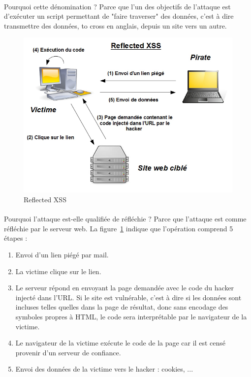 \paragraph{} Pourquoi cette dénomination ? Parce que l'un des objectifs de l'attaque est d’exécuter un script permettant de "faire traverser" des données, c'est à dire transmettre des données, to cross en anglais, depuis un site vers un autre. 

\begin{figure}[!h]
	\begin{center} 
		\includegraphics[scale=\scalekad]{images/xss/reflected_xss}
		\caption{Reflected XSS}
		\label{reflected_xss}  %
	\end{center}
\end{figure}


\paragraph{} Pourquoi l'attaque est-elle qualifiée de réfléchie ? Parce que l'attaque est comme réfléchie par le serveur web. La figure~\ref{reflected_xss} indique que l'opération comprend 5 étapes :


\begin{enumerate}
	\item   Envoi d'un lien piégé par mail. 
	\item La victime clique sur le lien.
	\item Le serveur répond en envoyant la page demandée avec le code du hacker injecté dans l'URL. Si le site est vulnérable, c'est à dire si les données sont incluses telles quelles dans la page de résultat, donc sans encodage des symboles propres à HTML, le code sera interprétable par le navigateur de la victime.
	\item Le navigateur de la victime exécute le code de la page car il est censé provenir d'un serveur de confiance. 
	\item Envoi des données de la victime  vers le hacker : cookies, ...
\end{enumerate}
 


